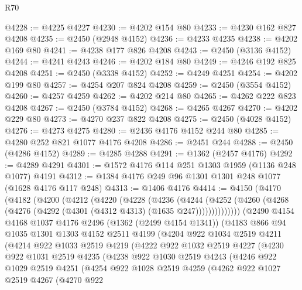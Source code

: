 \begin{lexlean}{R70}
\begin{coremodule}
@4228 := @4225 @4227
@4230 := @4202 @154 @80
@4233 := @4230 @162 @827 @4208
@4235 := @2450 (@2948 @4152)
@4236 := @4233 @4235
@4238 := @4202 @169 @80
@4241 := @4238 @177 @826 @4208
@4243 := @2450 (@3136 @4152)
@4244 := @4241 @4243
@4246 := @4202 @184 @80
@4249 := @4246 @192 @825 @4208
@4251 := @2450 (@3338 @4152)
@4252 := @4249 @4251
@4254 := @4202 @199 @80
@4257 := @4254 @207 @824 @4208
@4259 := @2450 (@3554 @4152)
@4260 := @4257 @4259
@4262 := @4202 @214 @80
@4265 := @4262 @222 @823 @4208
@4267 := @2450 (@3784 @4152)
@4268 := @4265 @4267
@4270 := @4202 @229 @80
@4273 := @4270 @237 @822 @4208
@4275 := @2450 (@4028 @4152)
@4276 := @4273 @4275
@4280 := @2436 @4176 @4152 @244 @80
@4285 := @4280 @252 @821 @1077 @4176 @4208
@4286 := @2451 @244
@4288 := @2450 (@4286 @4152)
@4289 := @4285 @4288
@4291 := @1362 (@2457 @4176)
@4292 := @4289 @4291
@4301 := @1572 @4176 @114 @251 @1303 @1959 (@1136 @248 @1077) @4191
@4312 := @1384 @4176 @249 @96 @1301 @1301 @248 @1077 (@1628 @4176 @117 @248)
@4313 := @1406 @4176
@4414 := @4150
    (@4170
      (@4182
        (@4200
          (@4212
            (@4220
              (@4228
                (@4236
                  (@4244
                    (@4252
                      (@4260 (@4268 (@4276 (@4292 (@4301 (@4312 @4313) (@1635 @247))))))))))))))
      (@2490
        @4154
        @4168
        @1037
        @4176
        @2496
        (@1362 (@2499 @4154 @1341))
        (@4183
          @866
          @94
          @1035
          @1301
          @1303
          @4152
          @2511
          @4199
          (@4204
            @922
            @1034
            @2519
            @4211
            (@4214
              @922
              @1033
              @2519
              @4219
              (@4222
                @922
                @1032
                @2519
                @4227
                (@4230
                  @922
                  @1031
                  @2519
                  @4235
                  (@4238
                    @922
                    @1030
                    @2519
                    @4243
                    (@4246
                      @922
                      @1029
                      @2519
                      @4251
                      (@4254
                        @922
                        @1028
                        @2519
                        @4259
                        (@4262
                          @922
                          @1027
                          @2519
                          @4267
                          (@4270
                            @922

\end{coremodule}
\end{lexlean}
